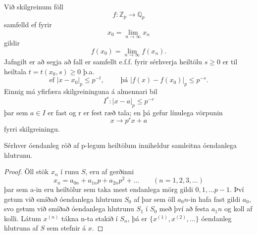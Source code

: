 \begin{skilgr}
Við skilgreinum föll
\begin{equation*}
f:\mathbb{Z}_p \rightarrow \mathbb{Q}_p
\end{equation*}
samfelld ef fyrir 
\begin{equation*}
x_0 = \lim_{n \rightarrow \infty} x_n
\end{equation*}
gildir
\begin{equation*}
f(x_0) = \lim_{n \rightarrow \infty} f(x_n).
\end{equation*}
Jafngilt er að segja að fall er samfellt e.f.f. fyrir sérhverja heiltölu $s\geq 0$ er til heiltala $t = t(x_0,s)\geq 0$ þ.a.
\begin{equation*}
\mbox{ef } |x-x_0|_p \leq p^{-t},\qquad \mbox{  þá } |f(x)-f(x_0)|_p \leq p^{-s}.
\end{equation*}
Einnig má yfirfæra skilgreininguna á almennari bil
\begin{equation*}
I^* : |x-a|_p \leq p^{-r}
\end{equation*} 
þar sem $a \in I$ er fast og r er fest ræð tala; en þá gefur línulega vörpunin 
\begin{equation*}
x \rightarrow p^rx+a
\end{equation*}
fyrri skilgreiningu.
\end{skilgr}

\begin{hjalparsetn}
Sérhver óendanleg röð af p-legum heiltölum inniheldur samleitna óendanlega hlutrunu. 
\end{hjalparsetn}
\begin{proof}
Öll stök $x_n$ í runu $S$, eru af gerðinni
\begin{equation*}
x_n = a_{0n} + a_{1n}p+a_{2n}p^2 + \ldots \qquad (n= 1,2,3,\ldots)
\end{equation*}
þar sem a-in eru heiltölur sem taka mest endanlega mörg gildi $0,1, \ldots p-1$.
Því getum við smíðað óendanlega hlutrunu $S_0$ af þar sem öll $a_0n$-in hafa fast gildi $a_0$, svo getum við 
smíðað óendanlega hlutrunu $S_1$ í $S_0$ með því að festa $a_1n$ og koll af kolli.
Látum $x^{(n)}$ tákna n-ta stakið í $S_n$, þá er $\{x^{(1)},x^{(2)},\ldots \}$ óendanleg hlutruna af $S$ sem stefnir á $x$. 
\end{proof}


